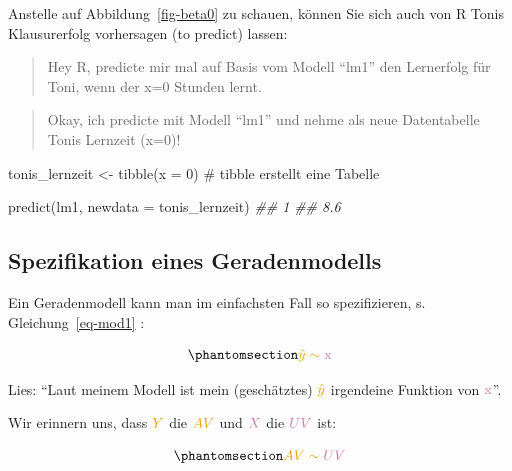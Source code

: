 \documentclass[
  a4paper,
]{scrbook}
\newenvironment{Shaded}{\begin{snugshade}}{\end{snugshade}}
\newcommand{\AttributeTok}[1]{\textcolor[rgb]{0.40,0.45,0.13}{#1}}
\newcommand{\CommentTok}[1]{\textcolor[rgb]{0.37,0.37,0.37}{#1}}
\newcommand{\DecValTok}[1]{\textcolor[rgb]{0.68,0.00,0.00}{#1}}
\newcommand{\DocumentationTok}[1]{\textcolor[rgb]{0.37,0.37,0.37}{\textit{#1}}}
\newcommand{\FunctionTok}[1]{\textcolor[rgb]{0.28,0.35,0.67}{#1}}
\newcommand{\NormalTok}[1]{\textcolor[rgb]{0.00,0.23,0.31}{#1}}
\newcommand{\OtherTok}[1]{\textcolor[rgb]{0.00,0.23,0.31}{#1}}
\theoremstyle{definition}
\theoremstyle{definition}
\theoremstyle{definition}
\theoremstyle{remark}
\begin{document}
Anstelle auf Abbildung~\ref{fig-beta0} zu schauen, können Sie sich auch
von R Tonis Klausurerfolg vorhersagen (to predict) lassen:

\begin{quote}
{} Hey R, predicte mir mal auf Basis vom Modell ``lm1''
den Lernerfolg für Toni, wenn der x=0 Stunden lernt.
\end{quote}

\begin{quote}
{} Okay, ich predicte mit Modell ``lm1'' und nehme als neue
Datentabelle Tonis Lernzeit (x=0)!
\end{quote}

\begin{Shaded}
\begin{Highlighting}[]
\NormalTok{tonis\_lernzeit }\OtherTok{\textless{}{-}} \FunctionTok{tibble}\NormalTok{(}\AttributeTok{x =} \DecValTok{0}\NormalTok{)  }\CommentTok{\# \textasciigrave{}tibble\textasciigrave{} erstellt eine Tabelle}
\end{Highlighting}
\end{Shaded}

\begin{Shaded}
\begin{Highlighting}[]
\FunctionTok{predict}\NormalTok{(lm1, }\AttributeTok{newdata =}\NormalTok{ tonis\_lernzeit)}
\DocumentationTok{\#\#   1 }
\DocumentationTok{\#\# 8.6}
\end{Highlighting}
\end{Shaded}

\subsection{Spezifikation eines
Geradenmodells}\label{spezifikation-eines-geradenmodells}

Ein Geradenmodell kann man im einfachsten Fall so spezifizieren, s.
Gleichung~\ref{eq-mod1} :

\begin{equation}\phantomsection\label{eq-mod1}{\color{ycol}{\hat{y}} \sim \color{xcol}{\text{x}}}\end{equation}

Lies: ``Laut meinem Modell ist mein (geschätztes)
\(\color{ycol}{\hat{y}}\) irgendeine Funktion von
\(\color{xcol}{\text{x}}\)''.

Wir erinnern uns, dass \(\color{ycol}{Y}\) die \(\color{ycol}{AV}\) und
\(\color{xcol}{X}\) die \(\color{xcol}{UV}\) ist:

\begin{equation}\phantomsection\label{eq-mod1}{\color{ycol}{AV} \sim \color{xcol}{UV}}\end{equation}
\end{document}
